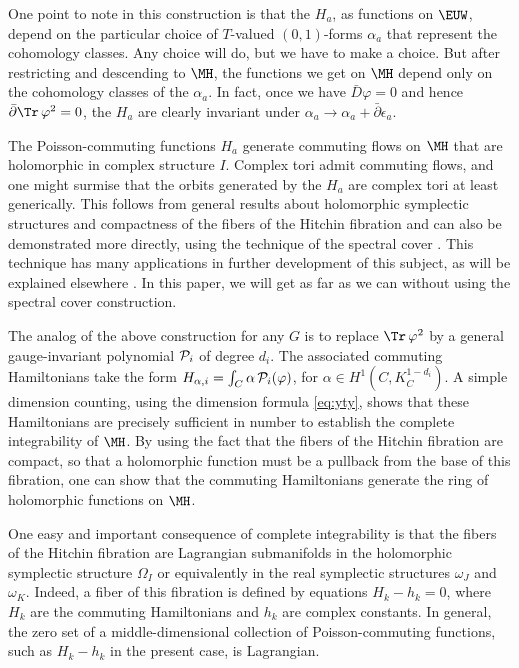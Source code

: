 One point to note in this construction is that the $H_a$, as
functions on $\EUW$, depend on the particular choice of $T$-valued
$(0,1)$-forms $\alpha_a$ that represent the cohomology classes.
Any choice will do, but we have to make a choice.  But after
restricting and descending to $\MH$, the functions we get on $\MH$
depend only on the cohomology classes of the $\alpha_a$. In fact,
once we have $\bar D\varphi=0$ and hence
$\bar\partial\Tr\,\varphi^2=0$, the $H_a$ are clearly invariant
under $\alpha_a\to\alpha_a+\bar\partial\epsilon_a$.

The Poisson-commuting functions $H_a$ generate commuting flows on
$\MH$ that are holomorphic in complex structure $I$.  Complex tori
admit commuting flows, and one might surmise that the orbits
generated by the $H_a$ are complex tori at least generically. This
follows from general results about holomorphic symplectic
structures and compactness of the fibers of the Hitchin fibration
and can also be demonstrated  more directly, using the technique
of the spectral cover \cite{ref20,ref62}. This technique has
many applications in further development of this subject, as will
be explained elsewhere \cite{ref26}. In this paper, we will get as far
as we can without using the spectral cover construction.

The analog of the above construction for any $G$ is to replace
$\Tr\,\varphi^2$ by a general gauge-invariant  polynomial ${\cal
P}_i$ of degree $d_i$. The associated commuting Hamiltonians take
the form $H_{\alpha,i}=\int_C \alpha \,{\cal P}_i(\varphi)$, for
$\alpha\in H^1(C,K_C^{1-d_i})$. A simple dimension counting, using
the dimension formula \eqref{eq:yty}, shows that these Hamiltonians are
precisely sufficient in number to establish the complete
integrability of $\MH$.  By using the fact that the fibers of the
Hitchin fibration are compact, so that a holomorphic function must
be a pullback from the base of this fibration, one can show that
the commuting Hamiltonians generate the ring of holomorphic
functions on $\MH$.

One easy and important consequence of complete integrability is
that the fibers of the Hitchin fibration are Lagrangian
submanifolds in the holomorphic symplectic structure $\Omega_I$ or
equivalently in the real symplectic structures $\omega_J$ and
$\omega_K$.  Indeed, a fiber of this fibration is defined by
equations $H_k-h_k=0$, where $H_k$ are the commuting Hamiltonians
and $h_k$ are complex constants.  In general, the zero set of a
middle-dimensional collection of Poisson-commuting functions, such
as $H_k-h_k$ in the present case, is Lagrangian.
